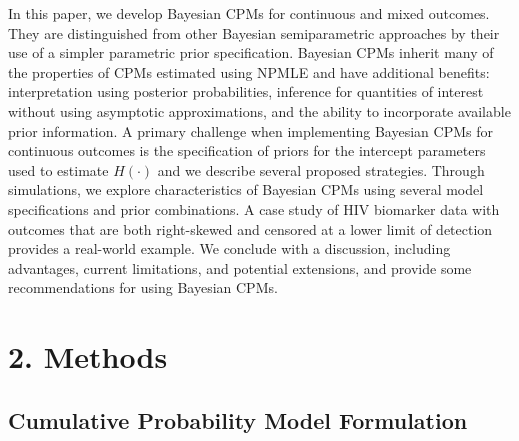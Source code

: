 \documentclass[
]{article}
\begin{document}
In this paper, we develop Bayesian CPMs for continuous and mixed outcomes.
They are distinguished from other Bayesian semiparametric approaches by their use of a simpler parametric prior specification. Bayesian CPMs inherit many of the properties of CPMs estimated using NPMLE and have additional benefits: interpretation using posterior probabilities, inference for quantities of interest without using asymptotic approximations, and the ability to incorporate available prior information.
A primary challenge when implementing Bayesian CPMs for continuous outcomes is the specification of priors for the intercept parameters used to estimate \(H(\cdot)\) and we describe several proposed strategies. Through simulations, we explore characteristics of Bayesian CPMs using several model specifications and prior combinations. A case study of HIV biomarker data with outcomes that are both right-skewed and censored at a lower limit of detection provides a real-world example. We conclude with a discussion, including advantages, current limitations, and potential extensions, and provide some recommendations for using Bayesian CPMs.

\hypertarget{methods}{%
\section{2. Methods}\label{methods}}

\hypertarget{cumulative-probability-model-formulation}{%
\subsection{Cumulative Probability Model Formulation}\label{cumulative-probability-model-formulation}}
\end{document}
